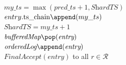 \begin{algorithm}[!tb]
{{                $\textit{my\_ts} = \max(\textit{pred\_ts}+1, \textit{ShardTS})$\\
                $entry.\mathrm{ts\_chain}\append(my\_ts)$\\
                \label{ts_assignment_pt2}
                $\textit{ShardTS} = \textit{my\_ts}+1$\\
            $\textit{bufferedMap}\pop(\textit{entry})$\\
            $\textit{orderedLog}\append(\textit{entry})$\\
            \Send $\textit{FinalAccept}(\textit{entry})$ to all $r \in \mathcal{R}$\\            
        }
    
    }
    \caption{Ellis\_Linear Leader Continued}
    \label{ellis-lin-leaderprotocol-continued}
\end{algorithm}



























